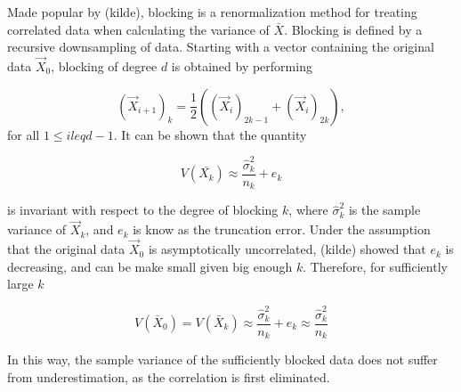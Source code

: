 Made popular by (kilde), blocking is a renormalization method for treating correlated data when calculating the variance of $\bar{X}$. Blocking is defined by a recursive downsampling of data. Starting with a vector containing the original data $\vec{X}_0$, blocking of degree $d$ is obtained by performing

\begin{equation*}
	(\vec{X}_{i+1})_k = \frac{1}{2}((\vec{X}_{i})_{2k -1} + (\vec{X}_{i})_{2k}),
\end{equation*}
for all $1 \leq i leq d-1$. 
\newline
It can be shown that the quantity 

\begin{equation*}
	V(\bar{X_k}) \approx \frac{\hat{\sigma}_k^2}{n_k} +  e_k
\end{equation*}

is invariant with respect to the degree of blocking $k$, where $\hat{\sigma}_k^2$ is the sample variance of $\vec{X}_k$, and $e_k$ is know as the truncation error. Under the assumption that the original data $\vec{X}_0$ is asymptotically uncorrelated, (kilde) showed that $e_k$ is decreasing, and can be make small given big enough $k$. Therefore, for sufficiently large $k$

\begin{equation*}
	V(\bar{X}_0) = V(\bar{X}_k) \approx \frac{\hat{\sigma}_k^2}{n_k} +  e_k \approx \frac{\hat{\sigma}_k^2}{n_k}
\end{equation*}

In this way, the sample variance of the sufficiently blocked data does not suffer from underestimation, as the correlation is first eliminated.
  
